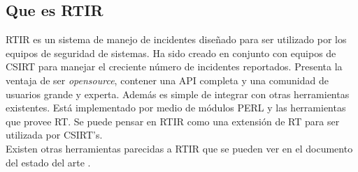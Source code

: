 \subsection{Que es RTIR}
RTIR es un sistema de manejo de incidentes diseñado para ser utilizado por los 
equipos de seguridad de sistemas. Ha sido creado en conjunto con equipos de CSIRT para manejar el creciente número de incidentes reportados.
Presenta la ventaja de ser \textit{opensource}, contener una API completa y una comunidad 
de usuarios grande y experta. Además es simple de integrar con otras 
herramientas existentes. Está implementado por medio de módulos PERL y las 
herramientas que provee RT. Se puede pensar en RTIR como una extensión de RT 
para ser utilizada por CSIRT's.\\

Existen otras herramientas parecidas a RTIR que se pueden ver en el documento del estado del arte \cite{AdvancedThreatsCollaboration}.